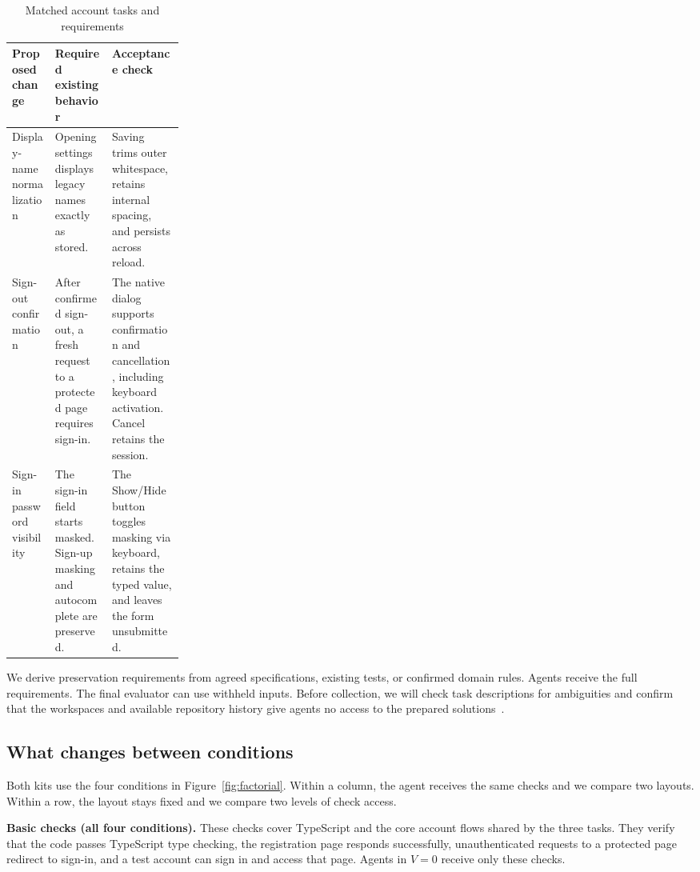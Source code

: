 \documentclass[11pt,a4paper]{article}
\begin{document}
\begin{table}[ht]
\small
\renewcommand{\arraystretch}{1.16}
\caption{Matched account tasks and requirements}
\label{tab:tasks}
\begin{tabularx}{\linewidth}{@{}>{\raggedright\arraybackslash}p{0.25\linewidth}YY@{}}
\toprule
Proposed change & Required existing behavior & Acceptance check\\
\midrule
Display-name normalization & Opening settings displays legacy names exactly as stored. & Saving trims outer whitespace, retains internal spacing, and persists across reload.\\
Sign-out confirmation & After confirmed sign-out, a fresh request to a protected page requires sign-in. & The native dialog supports confirmation and cancellation, including keyboard activation. Cancel retains the session.\\
Sign-in password visibility & The sign-in field starts masked. Sign-up masking and autocomplete are preserved. & The Show/Hide button toggles masking via keyboard, retains the typed value, and leaves the form unsubmitted.\\
\bottomrule
\end{tabularx}
\end{table}

We derive preservation requirements from agreed specifications, existing tests, or confirmed domain rules. Agents receive the full requirements. The final evaluator can use withheld inputs. Before collection, we will check task descriptions for ambiguities and confirm that the workspaces and available repository history give agents no access to the prepared solutions~\cite{xia2024agentless}.

\subsection{What changes between conditions}
Both kits use the four conditions in Figure~\ref{fig:factorial}. Within a column, the agent receives the same checks and we compare two layouts. Within a row, the layout stays fixed and we compare two levels of check access.



\noindent\textbf{Basic checks (all four conditions).}
These checks cover TypeScript and the core account flows shared by the three tasks. They verify that the code passes TypeScript type checking, the registration page responds successfully, unauthenticated requests to a protected page redirect to sign-in, and a test account can sign in and access that page. Agents in $V=0$ receive only these checks.
\end{document}
